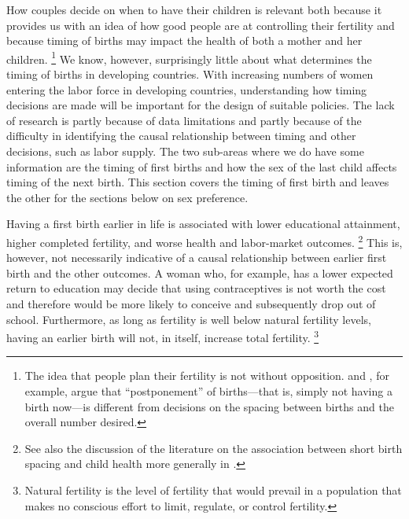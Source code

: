 \documentclass[letterpaper,12pt]{article}
\begin{document}
How couples decide on when to have their children is relevant both
because it provides us with an idea of how good people are at
controlling their fertility and because timing of births may impact the
health of both a mother and her children.%
\footnote{
The idea that people plan their fertility is not without opposition. 
\citet{Timaeus2008} and \citet{Moultrie2012}, for example, argue that
``postponement'' of births---that is, simply not having a birth now---is
different from decisions on the spacing between births and the overall
number desired.} 
We know, however, surprisingly little about what determines the timing
of births in developing countries. 
With increasing numbers of women entering the labor force in developing
countries, understanding how timing decisions are made will be important
for the design of suitable policies. 
The lack of research is partly because of data limitations and partly
because of the difficulty in identifying the causal relationship between
timing and other decisions, such as labor supply. 
The two sub-areas where we do have some information are the timing of
first births and how the sex of the last child affects timing of the
next birth. 
This section covers the timing of first birth and leaves the other for
the sections below on sex preference.

Having a first birth earlier in life is associated with lower
educational attainment, higher completed fertility, and worse health and
labor-market outcomes.%
\footnote{
See also the discussion of the literature on the association between
short birth spacing and child health more generally in
\citet{Casterline2016}.} 
This is, however, not necessarily indicative of a causal relationship
between earlier first birth and the other outcomes. 
A woman who, for example, has a lower expected return to education may
decide that using contraceptives is not worth the cost and therefore
would be more likely to conceive and subsequently drop out of school. 
Furthermore, as long as fertility is well below natural fertility
levels, having an earlier birth will not, in itself, increase total
fertility.%
\footnote{
Natural fertility is the level of fertility that would prevail in a
population that makes no conscious effort to limit, regulate, or control
fertility.}
\end{document}
